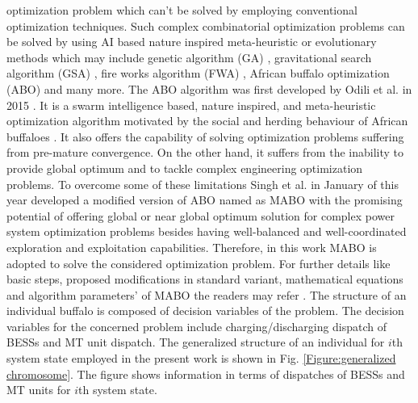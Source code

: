 \documentclass[journal]{IEEEtran}
\begin{document}
optimization problem which can’t be solved by employing conventional optimization techniques. Such complex combinatorial optimization problems can be solved by using AI based nature inspired meta-heuristic or evolutionary methods which may include genetic algorithm (GA) \cite{meena2017optimal}, gravitational search algorithm (GSA) \cite{singh2019double}, fire works algorithm (FWA) \cite{jadoun2018integration}, African buffalo optimization (ABO) \cite{singh2020modified} and many more. The ABO algorithm was first developed by Odili et al. in 2015 \cite{odili2015african}. It is a swarm intelligence based, nature inspired, and meta-heuristic optimization algorithm motivated by the social and herding behaviour of African buffaloes \cite{wilson1997altruism}. It also offers the capability of solving optimization problems suffering from pre-mature convergence. On the other hand, it suffers from the inability to provide global optimum and to tackle complex engineering optimization problems. To overcome some of these limitations Singh et al. in January of this year \cite{singh2020modified} developed a modified version of ABO named as MABO with the promising potential of offering global or near global optimum solution for complex power system optimization problems besides having well-balanced and well-coordinated exploration and exploitation capabilities. Therefore, in this work MABO is adopted to solve the considered optimization problem. For further details like basic steps, proposed modifications in standard variant, mathematical equations and algorithm parameters’ of MABO the readers may refer \cite{odili2015african,singh2020modified}. The structure of an individual buffalo is composed of decision variables of the problem. The decision variables for the concerned problem include charging/discharging dispatch of BESSs and MT unit dispatch. The generalized structure of an individual for $i$th system state employed in the present work is shown in Fig. \ref{Figure:generalized chromosome}. The figure shows information in terms of dispatches of BESSs and MT units for $i$th system state.
 
\end{document}
